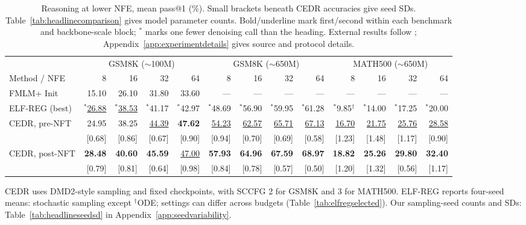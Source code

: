 \documentclass[11pt,letterpaper]{article}
\begin{document}
\begin{table}[!htb]
\caption{Reasoning at lower NFE, mean pass@1 (\%). Small brackets beneath CEDR accuracies give seed SDs. Table~\ref{tab:headlinecomparison} gives model parameter counts. Bold/underline mark first/second within each benchmark and backbone-scale block; $^{*}$ marks one fewer denoising call than the heading. External results follow \citet{posterior,scalingdlm}; Appendix~\ref{app:experimentdetails} gives source and protocol details.}
\label{tab:headlinelownfe}
\centering\small
\setlength{\tabcolsep}{1.7pt}
\begin{tabular}{@{}l*{12}{r}@{}}
\toprule
& \multicolumn{4}{c}{GSM8K ($\sim$100M)} & \multicolumn{4}{c}{GSM8K ($\sim$650M)} & \multicolumn{4}{c}{MATH500 ($\sim$650M)}\\
\cmidrule(lr){2-5}\cmidrule(lr){6-9}\cmidrule(lr){10-13}
Method / NFE & 8 & 16 & 32 & 64 & 8 & 16 & 32 & 64 & 8 & 16 & 32 & 64\\
\midrule
FMLM+ Init & 15.10 & 26.10 & 31.80 & 33.60 & --- & --- & --- & --- & --- & --- & --- & ---\\
ELF-REG (best) & $^{*}$\underline{26.88} & $^{*}$\underline{38.53} & $^{*}$41.17 & $^{*}$42.97 & $^{*}$48.69 & $^{*}$56.90 & $^{*}$59.95 & $^{*}$61.28 & $^{*}$9.85$^{\dagger}$ & $^{*}$14.00 & $^{*}$17.25 & $^{*}$20.00\\
CEDR, pre-NFT & 24.95 & 38.25 & \underline{44.39} & \textbf{47.62} & \underline{54.23} & \underline{62.57} & \underline{65.71} & \underline{67.13} & \underline{16.70} & \underline{21.75} & \underline{25.76} & \underline{28.58}\\
 & {\scriptsize [0.68]} & {\scriptsize [0.86]} & {\scriptsize [0.67]} & {\scriptsize [0.90]} & {\scriptsize [0.94]} & {\scriptsize [0.70]} & {\scriptsize [0.69]} & {\scriptsize [0.58]} & {\scriptsize [1.23]} & {\scriptsize [1.48]} & {\scriptsize [1.17]} & {\scriptsize [0.90]}\\
\addlinespace[2pt]
CEDR, post-NFT & \textbf{28.48} & \textbf{40.60} & \textbf{45.59} & \underline{47.00} & \textbf{57.93} & \textbf{64.96} & \textbf{67.59} & \textbf{68.97} & \textbf{18.82} & \textbf{25.26} & \textbf{29.80} & \textbf{32.40}\\
 & {\scriptsize [0.79]} & {\scriptsize [0.81]} & {\scriptsize [0.64]} & {\scriptsize [0.98]} & {\scriptsize [0.84]} & {\scriptsize [0.78]} & {\scriptsize [0.57]} & {\scriptsize [0.50]} & {\scriptsize [1.20]} & {\scriptsize [1.32]} & {\scriptsize [0.56]} & {\scriptsize [1.17]}\\
\bottomrule
\end{tabular}
\vspace{3pt}
\parbox{\linewidth}{\footnotesize CEDR uses DMD2-style sampling and fixed checkpoints, with SCCFG 2 for GSM8K and 3 for MATH500. ELF-REG reports four-seed means: stochastic sampling except $^\dagger$ODE; settings can differ across budgets (Table~\ref{tab:elfregselected}). Our sampling-seed counts and SDs: Table~\ref{tab:headlineseedsd} in Appendix~\ref{app:seedvariability}.}
\end{table}
\end{document}
